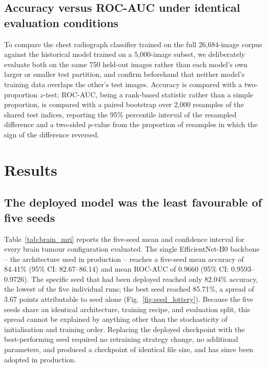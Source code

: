 \documentclass[conference]{IEEEtran}
\begin{document}
\subsection{Accuracy versus ROC-AUC under identical evaluation conditions}
To compare the chest radiograph classifier trained on the full 26{,}684-image corpus against the historical model trained on a 5{,}000-image subset, we deliberately evaluate both on the same 750 held-out images rather than each model's own larger or smaller test partition, and confirm beforehand that neither model's training data overlaps the other's test images. Accuracy is compared with a two-proportion $z$-test; ROC-AUC, being a rank-based statistic rather than a simple proportion, is compared with a paired bootstrap over 2{,}000 resamples of the shared test indices, reporting the 95\% percentile interval of the resampled difference and a two-sided $p$-value from the proportion of resamples in which the sign of the difference reversed.

\section{Results}
\label{sec:results}

\subsection{The deployed model was the least favourable of five seeds}



Table~\ref{tab:brain_mri} reports the five-seed mean and confidence interval for every brain tumour configuration evaluated. The single EfficientNet-B0 backbone -- the architecture used in production -- reaches a five-seed mean accuracy of 84.41\% (95\% CI: 82.67--86.14) and mean ROC-AUC of 0.9660 (95\% CI: 0.9593--0.9726). The specific seed that had been deployed reached only 82.04\% accuracy, the lowest of the five individual runs; the best seed reached 85.71\%, a spread of 3.67 points attributable to seed alone (Fig.~\ref{fig:seed_lottery}). Because the five seeds share an identical architecture, training recipe, and evaluation split, this spread cannot be explained by anything other than the stochasticity of initialisation and training order. Replacing the deployed checkpoint with the best-performing seed required no retraining strategy change, no additional parameters, and produced a checkpoint of identical file size, and has since been adopted in production.
\end{document}
